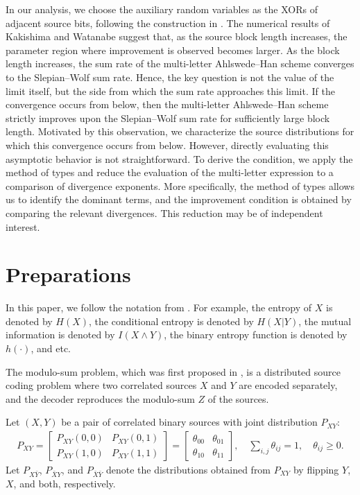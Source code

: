 \documentclass[journal,onecolumn]{IEEEtran}
\theoremstyle{definition}
\theoremstyle{remark}
\begin{document}
In our analysis, 
we choose the auxiliary random variables as the XORs of adjacent source bits, 
following the construction in \cite{KW}. The numerical results of Kakishima and Watanabe suggest that, 
as the source block length increases, the parameter region where improvement is observed becomes larger. 
As the block length increases, the sum rate of the multi-letter Ahlswede--Han scheme converges to the Slepian--Wolf sum rate. 
Hence, the key question is not the value of the limit itself, but the side from which the sum rate approaches this limit. 
If the convergence occurs from below, then the multi-letter Ahlswede--Han scheme strictly improves upon the Slepian--Wolf sum rate for sufficiently large block length. Motivated by this observation, we characterize the source distributions for which this convergence occurs from below.
However, directly evaluating this asymptotic behavior is not straightforward. 
To derive the condition, we apply the method of types and reduce the evaluation of the multi-letter expression to a comparison of divergence exponents. 
More specifically, the method of types allows us to identify the dominant terms, and the improvement condition is obtained by comparing the relevant divergences. 
This reduction may be of independent interest.


% 
\section{Preparations}
In this paper, we follow the notation from \cite{Csiszár_Körner_2011}.
For example, the entropy of $X$ is denoted by $H(X)$, 
the conditional entropy is denoted by $H(X|Y)$, 
the mutual information is denoted by $I(X\wedge Y)$, 
the binary entropy function is denoted by $h(\cdot)$,
and etc.

The modulo-sum problem, which was first proposed in \cite{KM}, is a distributed source coding problem  where two correlated sources $X$ and $Y$ are encoded separately, and the decoder reproduces the modulo-sum $Z$ of the sources.

Let $(X,Y)$ be a pair of correlated binary sources with joint distribution $P_{XY}$:
\begin{align*}
    P_{XY} = \begin{bmatrix}P_{XY}(0,0) & P_{XY}(0,1) \\ P_{XY}(1,0) & P_{XY}(1,1)\end{bmatrix}=\begin{bmatrix} \theta_{00}& \theta_{01} \\ \theta_{10} & \theta_{11}\end{bmatrix}, \quad \sum_{i,j} \theta_{ij}=1, \quad \theta_{ij}\geq 0.
\end{align*}
Let $P_{X\bar Y}$, $P_{\bar X Y}$, and $P_{\bar X\bar Y}$
denote the distributions obtained from $P_{XY}$ by flipping $Y$, $X$, and both, respectively.
\end{document}
